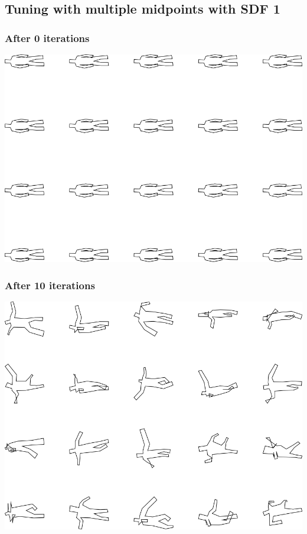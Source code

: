\subsection{Tuning with multiple midpoints with SDF 1}

\subsubsection{After 0 iterations}

\includegraphics[width=6in]{output/3.learning/multi_tuning/multi_tuning_iter0_.png}
\subsubsection{After 10 iterations}

\includegraphics[width=6in]{output/3.learning/multi_tuning/multi_tuning_iter10_.png}
